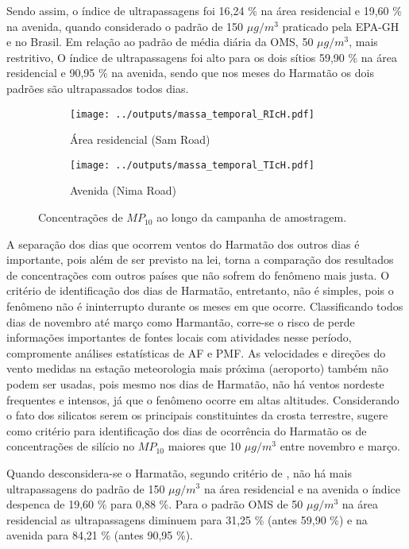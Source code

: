 Sendo assim, o índice de ultrapassagens foi 16,24 \% na área 
residencial e 19,60 \% na avenida, quando considerado o padrão de 150 
$\mu g / m^3$ praticado pela EPA-GH e no Brasil. Em relação
ao padrão de média diária da OMS, 50 $\mu g / m^3$, mais restritivo, 
O índice de ultrapassagens foi alto para os dois sítios 59,90 \% 
na área residencial e 90,95 \% na avenida, sendo que nos meses do Harmatão 
os dois padrões são ultrapassados todos dias. 

\begin{figure}[H]
  \centering
  \begin{subfigure}[b]{0.45\textwidth}
    \texttt{[image: ../outputs/massa\_temporal\_RIcH.pdf]}
    \caption{Área residencial (Sam Road)}
  \end{subfigure}%
  \begin{subfigure}[b]{0.45\textwidth}
    \texttt{[image: ../outputs/massa\_temporal\_TIcH.pdf]}
    \caption{Avenida (Nima Road)}
  \end{subfigure}
  \caption{Concentrações de $MP_{10}$ ao longo da campanha de amostragem.
           \label{fig:massa_temporal_mp10}}
\end{figure}

A separação dos dias que ocorrem ventos do Harmatão dos outros dias é importante,
pois além de ser previsto na lei, torna a comparação dos resultados de 
concentrações com outros países que não sofrem do fenômeno mais justa. 
O critério de identificação dos dias de Harmatão, entretanto, não é simples, 
pois o fenômeno 
não é ininterrupto durante os meses em que ocorre. Classificando todos dias
de novembro até março como Harmantão, corre-se o risco de perde informações 
importantes de fontes locais com atividades nesse período, compromente análises
estatísticas de AF e PMF. 
As velocidades e direções do vento medidas na estação meteorologia mais próxima
(aeroporto) também não podem ser usadas, pois mesmo nos dias de Harmatão, 
não há ventos nordeste frequentes e intensos, já que o fenômeno ocorre em 
altas altitudes. 
Considerando o fato dos silicatos serem os principais constituintes da crosta
terrestre, \citet{aboh2009} sugere como critério para identificação dos dias 
de ocorrência do Harmatão os de concentrações de silício no $MP_{10}$ maiores 
que 10 $\mu g/m^3$ entre novembro e março. 

Quando desconsidera-se o Harmatão, segundo critério de \citet{aboh2009},
não há mais ultrapassagens do padrão de 150 $\mu g / m^3$ na área residencial 
e na avenida o índice despenca de 19,60 \% para 0,88 \%. 
Para o padrão OMS de 50 $\mu g / m^3$ na área residencial as 
ultrapassagens diminuem para 31,25 \% (antes 59,90 \%) e na avenida para 
84,21 \% (antes 90,95 \%).

